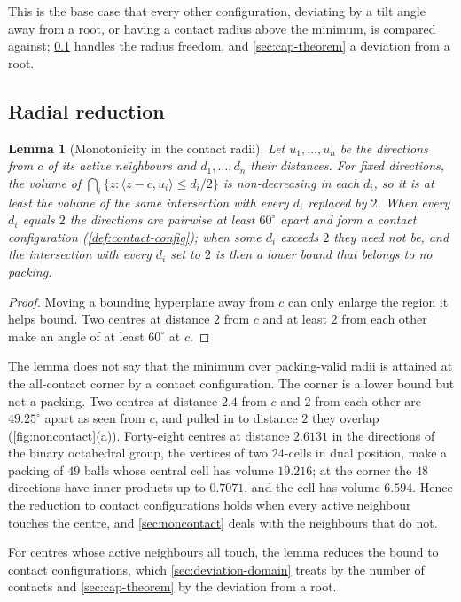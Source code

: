 \documentclass[11pt,reqno]{amsart}
\renewcommand{\_}{\origunderscore\allowbreak}
\numberwithin{equation}{section}
\theoremstyle{plain}
\newtheorem{lem}[thm]{Lemma}
\theoremstyle{definition}
\theoremstyle{remark}
\begin{document}
This is the base case that every other configuration, deviating by a
tilt angle away from a root, or having a contact radius above the
minimum, is compared against; \cref{sec:radial-new} handles the
radius freedom, and \cref{sec:cap-theorem} a deviation from a root.

\subsection{Radial reduction}\label{sec:radial-new}

\begin{lem}[Monotonicity in the contact radii]\label{lem:radial-new}
Let $u_1,\dots,u_n$ be the directions from $c$ of its active neighbours
and $d_1,\dots,d_n$ their distances. For fixed directions, the volume of
$\bigcap_i\{z:\langle z-c,u_i\rangle\le d_i/2\}$ is non-decreasing in each
$d_i$, so it is at least the volume of the same intersection with every
$d_i$ replaced by $2$. When every $d_i$ equals $2$ the directions are
pairwise at least $60^\circ$ apart and form a contact configuration
(\cref{def:contact-config}); when some $d_i$ exceeds $2$ they need not
be, and the intersection with every $d_i$ set to $2$ is then a lower
bound that belongs to no packing.
\end{lem}

\begin{proof}
Moving a bounding hyperplane away from $c$ can only enlarge the region it
helps bound. Two centres at distance $2$ from $c$ and at least $2$ from
each other make an angle of at least $60^\circ$ at $c$.
\end{proof}

The lemma does not say that the minimum over packing-valid radii is
attained at the all-contact corner by a contact configuration. The
corner is a lower bound but not a packing. Two centres at distance $2.4$
from $c$ and $2$ from each other are $49.25^\circ$ apart as seen from
$c$, and pulled in to distance $2$ they overlap
(\cref{fig:noncontact}(a)). Forty-eight centres at distance $2.6131$ in
the directions of the binary octahedral group, the vertices of two
$24$-cells in dual position, make a packing of $49$ balls whose central
cell has volume $19.216$; at the corner the $48$ directions have inner
products up to $0.7071$, and the cell has volume $6.594$. Hence the
reduction to contact configurations holds when every active neighbour
touches the centre, and \cref{sec:noncontact} deals with the neighbours
that do not.

For centres whose active neighbours all touch, the lemma reduces the
bound to contact configurations, which \cref{sec:deviation-domain}
treats by the number of contacts and \cref{sec:cap-theorem} by the
deviation from a root.
\end{document}
